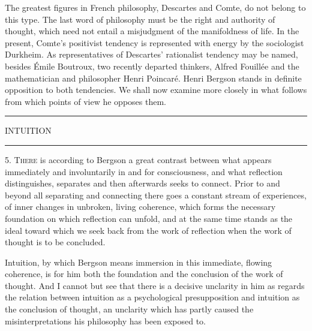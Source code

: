 \documentclass[12pt,a4paper,openany]{book}
\newcommand{\opage}[1]{\marginnote{\footnotesize\textit{[#1]}}}
\newcommand{\chapterhead}[1]{\clearpage\phantomsection\addcontentsline{toc}{chapter}{#1}\vspace*{3cm}\begin{center}{\large #1}\\[6pt]\rule{1.2cm}{0.4pt}\end{center}\medskip}
\newcommand{\initial}[2]{{\Large #1}\textsc{#2}}
\newcommand{\chapterend}{\par\begin{center}\rule{2.5cm}{0.4pt}\end{center}}
\begin{document}
The greatest figures in French philosophy, Descartes and Comte, do not belong to this type. The last word of philosophy must be the right and authority of thought, which need not entail a misjudgment of the manifoldness of life. In the present, Comte's positivist tendency is represented with energy by the sociologist Durkheim. As representatives of Descartes' rationalist tendency may be named, besides Émile Boutroux, two recently departed thinkers, Alfred Fouillée and the mathematician and philosopher Henri Poincaré. Henri Bergson stands in definite opposition to both tendencies. We shall now examine more closely in what follows from which points of view he opposes them.

\chapterend

\chapterhead{INTUITION}

\opage{11}5. \initial{T}{here} is according to Bergson a great contrast between what appears immediately and involuntarily in and for consciousness, and what reflection distinguishes, separates and then afterwards seeks to connect. Prior to and beyond all separating and connecting there goes a constant stream of experiences, of inner changes in unbroken, living coherence, which forms the necessary foundation on which reflection can unfold, and at the same time stands as the ideal toward which we seek back from the work of reflection when the work of thought is to be concluded.

Intuition, by which Bergson means immersion in this immediate, flowing coherence, is for him both the foundation and the conclusion of the work of thought. And I cannot but see that there is a decisive unclarity in him as regards the relation between intuition as a psychological presupposition and intuition as the conclusion of thought, an unclarity which has partly caused the misinterpretations his philosophy has been exposed to.
\end{document}
